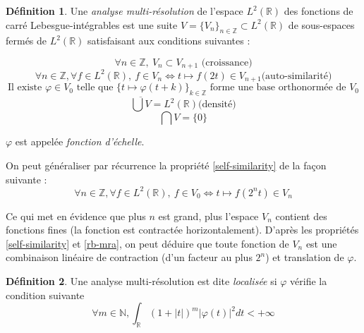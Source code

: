 \documentclass[]{article}
\theoremstyle{remark}
\theoremstyle{definition}
\newtheorem{mydef}{Définition}
\begin{document}
	\begin{mydef}
		Une \textit{analyse multi-résolution} de l'espace $L^2(\mathbb{R})$ des fonctions de carré Lebesgue-intégrables est une suite $V = \{V_n\}_{n \in \mathbb{Z}} \subset L^2(\mathbb{R})$ de sous-espaces fermés de $L^2(\mathbb{R})$ satisfaisant aux conditions suivantes :

		\begin{equation}
			\label{growth}
			\forall n \in \mathbb{Z}, ~ V_{n} \subset V_{n+1} \text{ (croissance)}
		\end{equation}
		\begin{equation}
			\label{self-similarity}
			\forall n \in \mathbb{Z}, \forall f \in L^2(\mathbb{R}), ~ f \in V_n \Longleftrightarrow t \mapsto f \left(2 t\right) \in V_{n+1} \text{(auto-similarité)}
		\end{equation}
		\begin{equation}
			\label{rb-mra}
			\text{Il existe $\varphi \in V_0$ telle que $\{t \mapsto \varphi(t + k)\}_{k \in \mathbb{Z}}$ forme une base orthonormée de $V_0$}
		\end{equation}
		\begin{equation}
			\label{density}
			\overline{\bigcup V} = L^2(\mathbb{R}) \text{(densité)}
		\end{equation}
		\begin{equation}
			\label{inter}
			\bigcap V = \{0\}
		\end{equation}
		
		$\varphi$ est appelée \textit{fonction d'échelle}.
	\end{mydef}
	
	On peut généraliser par récurrence la propriété \ref{self-similarity} de la façon suivante :
	\begin{equation}
		\forall n \in \mathbb{Z}, \forall f \in L^2(\mathbb{R}), ~ f \in V_0 \Longleftrightarrow t \mapsto f \left(2^n t\right) \in V_{n}
	\end{equation}

	Ce qui met en évidence que plus $n$ est grand, plus l'espace $V_n$ contient des fonctions fines (la fonction est contractée horizontalement). D'après les propriétés \ref{self-similarity} et \ref{rb-mra}, on peut déduire que toute fonction de $V_n$ est une combinaison linéaire de contraction (d'un facteur au plus $2^n$) et translation de $\varphi$.

	\begin{mydef}
		Une analyse multi-résolution est dite \textit{localisée} si $\varphi$ vérifie la condition suivante
		\begin{equation}
			\label{localized}
			\forall m \in \mathbb{N}, \int_\mathbb{R} (1+|t|)^m |\varphi(t)|^2 dt < + \infty
		\end{equation}
	\end{mydef}
	
\end{document}
